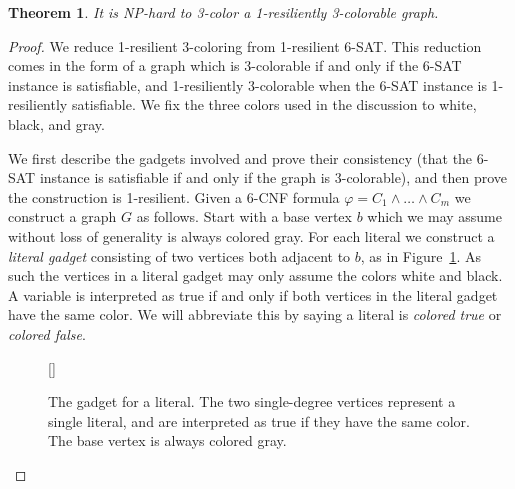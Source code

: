 \documentclass{llncs}
\newtheorem{thm}{Theorem}
\begin{document}
\begin{thm}\label{thm:3-1}
It is NP-hard to 3-color a 1-resiliently 3-colorable graph.
\end{thm}
\begin{proof}
We reduce 1-resilient 3-coloring from 1-resilient 6-SAT. This reduction comes
in the form of a graph which is 3-colorable if and only if the 6-SAT instance is
satisfiable, and 1-resiliently 3-colorable when the 6-SAT instance is
1-resiliently satisfiable. We fix the three colors used in the discussion to
white, black, and gray.

We first describe the gadgets involved and prove their consistency (that the
6-SAT instance is satisfiable if and only if the graph is 3-colorable), and
then prove the construction is 1-resilient. Given a 6-CNF formula $\varphi = C_1
\wedge \dots \wedge C_m$ we construct a graph $G$ as follows. Start with a base
vertex $b$ which we may assume without loss of generality is always colored
gray. For each literal we construct a \emph{literal gadget} consisting of two
vertices both adjacent to $b$, as in Figure~\ref{fig:literal-gadget}. As such
the vertices in a literal gadget may only assume the colors white and black. A
variable is interpreted as true if and only if both vertices in the literal
gadget have the same color. We will abbreviate this by saying a literal is
\emph{colored true} or \emph{colored false}.


\begin{figure}
[\FBwidth]
{\caption{The gadget for a literal. The two single-degree vertices represent a
single literal, and are interpreted as true if they have the same color. The
base vertex is always colored gray.}\label{fig:literal-gadget}}
{}
\end{figure}



\end{proof}
\end{document}
